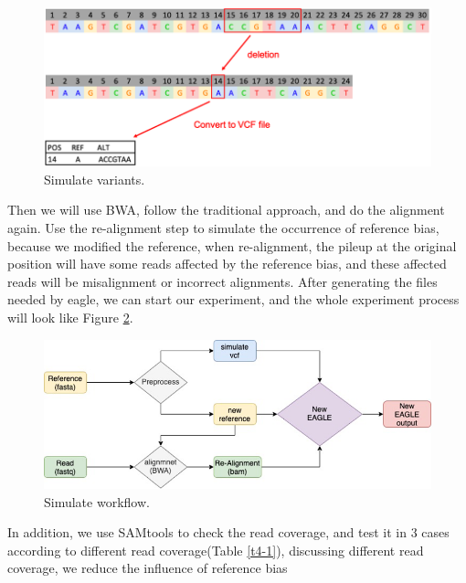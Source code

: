 \vspace{1cm}
\begin{figure}[H]
    \centering
    \includegraphics[width=1\columnwidth]{body/image/4-1.png}
    \captionsetup{labelfont=bf}
    \renewcommand{\baselinestretch}{1.0}
    \vspace{-1cm}
    \caption[Simulate variants]{Simulate variants.}
    \label{f4-1}
\end{figure}

Then we will use BWA, follow the traditional approach, and do the alignment again. Use the re-alignment step to simulate the occurrence of reference bias, because we modified the reference, when re-alignment, the pileup at the original position will have some reads affected by the reference bias, and these affected reads will be misalignment or incorrect alignments. After generating the files needed by eagle, we can start our experiment, and the whole experiment process will look like Figure \ref{f4-2}.

\vspace{1cm}
\begin{figure}[H]
    \centering
    \includegraphics[width=1\columnwidth]{body/image/4-2.png}
    \captionsetup{labelfont=bf}
    \renewcommand{\baselinestretch}{1.0}
    \vspace{-1cm}
    \caption[Simulate workflow]{Simulate workflow.}
    \label{f4-2}
\end{figure}

In addition, we use SAMtools to check the read coverage, and test it in 3 cases according to different read coverage(Table \ref{t4-1}), discussing different read coverage, we reduce the influence of reference bias


